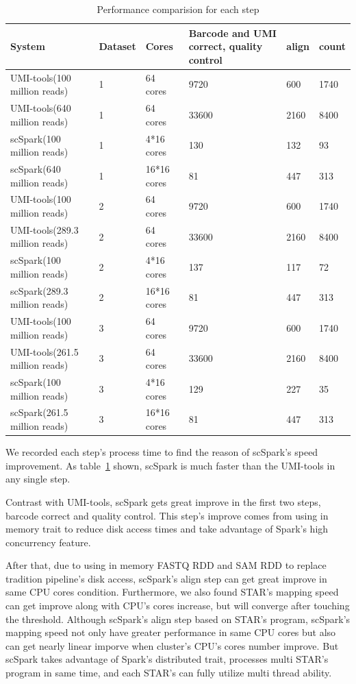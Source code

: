 \documentclass[conference]{IEEEtran}
\begin{document}
\begin{table}
	\centering
	\caption{Performance comparision for each step}\label{tab2}
	\resizebox{0.45\textwidth}{!} {
	\begin{tabular}{l | l | l | l | l | l}
		\hline
		System & Dataset & Cores & Barcode and UMI correct, quality control & align & count \\
		\hline
		UMI-tools(100 million reads) & 1 & 64 cores & 9720 & 600 & 1740 \\
		UMI-tools(640 million reads) & 1 & 64 cores & 33600 & 2160 & 8400 \\
		scSpark(100 million reads) & 1 & 4*16 cores & 130 & 132 & 93 \\
		scSpark(640 million reads) & 1 & 16*16 cores & 81 & 447 & 313 \\
		UMI-tools(100 million reads) & 2 & 64 cores & 9720 & 600 & 1740 \\
		UMI-tools(289.3 million reads) & 2 & 64 cores & 33600 & 2160 & 8400 \\
		scSpark(100 million reads) & 2 & 4*16 cores & 137 & 117 & 72 \\
		scSpark(289.3 million reads) & 2 & 16*16 cores & 81 & 447 & 313 \\
		UMI-tools(100 million reads) & 3 & 64 cores & 9720 & 600 & 1740 \\
		UMI-tools(261.5 million reads) & 3 & 64 cores & 33600 & 2160 & 8400 \\
		scSpark(100 million reads) & 3 & 4*16 cores & 129 & 227 & 35 \\
		scSpark(261.5 million reads) & 3 & 16*16 cores & 81 & 447 & 313 \\
		\hline
	\end{tabular} }
\end{table}

We recorded each step's process time to find the reason of scSpark's speed improvement.
As table~\ref{tab2} shown, scSpark is much faster than the UMI-tools in any single step.

Contrast with UMI-tools, scSpark gets great improve in the first two steps, barcode correct and quality control.
This step's improve comes from using in memory trait to reduce disk access times and take advantage of Spark's high concurrency feature.

After that, due to using in memory FASTQ RDD and SAM RDD to replace tradition pipeline's disk access, scSpark's align step can get great improve in same CPU cores condition.
Furthermore, we also found STAR's mapping speed can get improve along with CPU's cores increase, but will converge after touching the threshold.
Although scSpark's align step based on STAR's program, scSpark's mapping speed not only have greater performance in same CPU cores but also can get nearly linear imporve when cluster's CPU's cores number improve.
But scSpark takes advantage of Spark's distributed trait, processes multi STAR's program in same time, and each STAR's can fully utilize multi thread ability.
\end{document}
